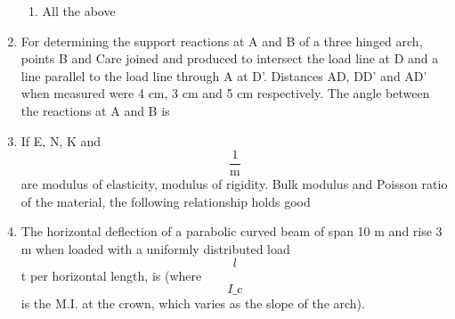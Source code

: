 \documentclass[11pt,a4paper]{article}
\begin{document}
\begin{enumerate}
\begin{enumerate}[label=\Alph*.]
\item{All the above}
\end{enumerate}
\item{For determining the support reactions at A and B of a three hinged arch, points B and Care joined and produced to intersect the load line at D and a line parallel to the load line through A at D'. Distances AD, DD' and AD' when measured were 4 cm, 3 cm and 5 cm respectively. The angle between the reactions at A and B is
}
\\
\item{If E, N, K and $$\frac{1}{{\text{m}}}$$ are modulus of elasticity, modulus of rigidity. Bulk modulus and Poisson ratio of the material, the following relationship holds good}
\\
\item{The horizontal deflection of a parabolic curved beam of span 10 m and rise 3 m when loaded with a uniformly distributed load $$l$$ t per horizontal length, is (where $${I\_{\text{c}}}$$ is the M.I. at the crown, which varies as the slope of the arch).}
\\

\end{enumerate}
\end{document}
